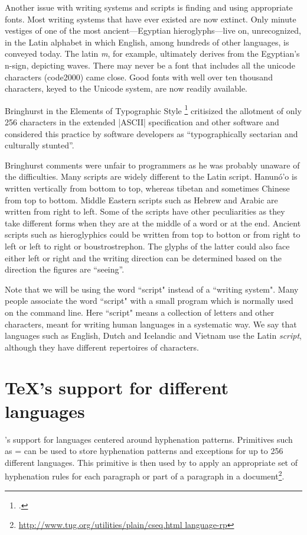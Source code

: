 Another issue with writing systems and scripts is finding and using appropriate fonts. Most writing systems that have ever existed are now extinct. Only minute vestiges of one of the most ancient---Egyptian hieroglyphs---live on, unrecognized, in the Latin alphabet in which English, among hundreds of other languages, is conveyed today. The latin \textit{m}, for example, ultimately derives from the Egyptian's n-sign, depicting waves. There may never be a font that includes all the unicode characters (code2000) came close. Good fonts with well over ten thousand characters, keyed to the Unicode system, are now readily available. 

Bringhurst in the Elements of Typographic Style \footcite{Bringhurst2005} critisized the allotment of only 256 characters in the extended |ASCII| specification and other software and considered this practice by software developers as \enquote{typographically sectarian and culturally stunted}. 


Bringhurst comments were unfair to programmers as he was probably unaware of the difficulties. Many  scripts are widely different to the Latin script. Hanunó'o is written vertically from bottom to top, whereas tibetan and sometimes Chinese from top to bottom.  Middle Eastern scripts such as Hebrew and Arabic are written from right to left. Some of the scripts have other peculiarities as they take different forms when they are at the middle of a word or at the end. Ancient scripts such as hieroglyphics could be written from top to botton or from right to left or left to right or boustrostrephon. The glyphs of the latter could also face either left or right and the writing direction can be determined based on the direction the figures are \enquote{seeing}.

Note that  we will be using the word ``script" instead of a ``writing system". Many people associate the word ``script" with a small program which is normally used on the command line. Here ``script" means a collection of letters and other characters, meant for writing human languages in a systematic way.  We say that languages such as English, Dutch and Icelandic and Vietnam use the Latin \emph{script}, although they have different repertoires of characters. 


\section{TeX's support for different languages}

\tex's support for languages centered around hyphenation patterns.
Primitives such as = can be used to store hyphenation patterns and exceptions for up to 256 different languages. 
This primitive is then used by \tex to apply an appropriate set of hyphenation rules for each paragraph or part of a paragraph in a document\footnote{\url{http://www.tug.org/utilities/plain/cseq.html language-rp}}. 

